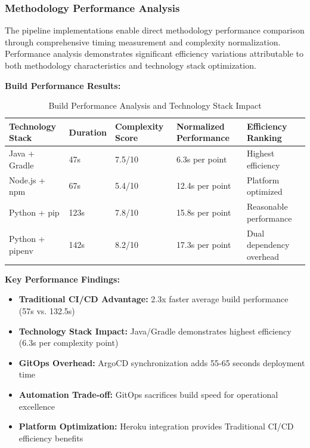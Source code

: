 \subsubsection{Methodology Performance Analysis}

The pipeline implementations enable direct methodology performance comparison through comprehensive timing measurement and complexity normalization. Performance analysis demonstrates significant efficiency variations attributable to both methodology characteristics and technology stack optimization.

\textbf{Build Performance Results:}

\begin{table}[H]
\centering
\caption{Build Performance Analysis and Technology Stack Impact}
\label{tab:build-performance-analysis}
\begin{tabular}{|p{3cm}|p{2cm}|p{2.5cm}|p{2.5cm}|p{3cm}|}
\hline
\textbf{Technology Stack} & \textbf{Duration} & \textbf{Complexity Score} & \textbf{Normalized Performance} & \textbf{Efficiency Ranking} \\
\hline
Java + Gradle & 47s & 7.5/10 & 6.3s per point & Highest efficiency \\
\hline
Node.js + npm & 67s & 5.4/10 & 12.4s per point & Platform optimized \\
\hline
Python + pip & 123s & 7.8/10 & 15.8s per point & Reasonable performance \\
\hline
Python + pipenv & 142s & 8.2/10 & 17.3s per point & Dual dependency overhead \\
\hline
\end{tabular}
\end{table}

\textbf{Key Performance Findings:}
\begin{itemize}
\item \textbf{Traditional CI/CD Advantage:} 2.3x faster average build performance (57s vs. 132.5s)
\item \textbf{Technology Stack Impact:} Java/Gradle demonstrates highest efficiency (6.3s per complexity point)
\item \textbf{GitOps Overhead:} ArgoCD synchronization adds 55-65 seconds deployment time
\item \textbf{Automation Trade-off:} GitOps sacrifices build speed for operational excellence
\item \textbf{Platform Optimization:} Heroku integration provides Traditional CI/CD efficiency benefits
\end{itemize}

